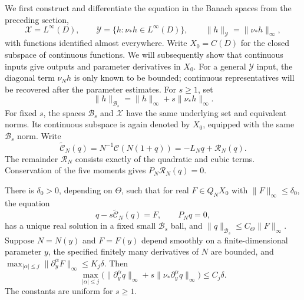 We first construct and differentiate the equation in the Banach spaces
from the preceding section,
\[
 \mathcal X=L^\infty(D),\qquad
 \mathcal Y=\{h:\nu_*h\in L^\infty(D)\},
 \qquad\|h\|_{\mathcal Y}=\|\nu_*h\|_\infty,
\]
with functions identified almost everywhere. Write $X_0=C(D)$ for the
closed subspace of continuous functions. We will subsequently show that
continuous inputs give outputs and parameter derivatives in $X_0$.
For a general $\mathcal Y$ input, the diagonal term $\nu_Nh$ is only
known to be bounded; continuous representatives will be recovered after
the parameter estimates. For $s\ge1$, set
\[
 \|h\|_{\mathcal B_s}=\|h\|_\infty+s\|\nu_*h\|_\infty.
\]
For fixed $s$, the spaces $\mathcal B_s$ and $\mathcal X$ have the same
underlying set and equivalent norms. Its continuous subspace is again
denoted by $X_0$, equipped with the same $\mathcal B_s$ norm. Write
\begin{equation}\label{hyd:remainder}
 \widetilde{\mathcal C}_N(q)=N^{-1}\mathcal C(N(1+q))
             =-L_Nq+\mathcal R_N(q).
\end{equation}
The remainder $\mathcal R_N$ consists exactly of the quadratic and cubic
terms. Conservation of the five moments gives $P_N\mathcal R_N(q)=0$.

\begin{lemma}\label{hyd:cell}
 There is $\delta_0>0$, depending on $\Theta$, such that for real
 $F\in Q_NX_0$ with $\|F\|_\infty\le\delta_0$, the equation
 \begin{equation}\label{hyd:cell-small}
 q-s\widetilde{\mathcal C}_N(q)=F,\qquad P_Nq=0,
 \end{equation}
 has a unique real solution in a fixed small $\mathcal B_s$ ball, and
 $\|q\|_{\mathcal B_s}\le C_\Theta\|F\|_\infty$.
 Suppose $N=N(y)$ and $F=F(y)$ depend smoothly on a finite-dimensional
 parameter $y$, the specified finitely many derivatives of $N$ are
 bounded, and
 $\max_{|\alpha|\le j}\|\partial_y^\alpha F\|_\infty\le K_j\delta$.
 Then
 \begin{equation}\label{hyd:cell-jets}
 \max_{|\alpha|\le j}\bigl(
 \|\partial_y^\alpha q\|_\infty
       +s\|\nu_*\partial_y^\alpha q\|_\infty\bigr)
 \le C_j\delta.
 \end{equation}
 The constants are uniform for $s\ge1$.
\end{lemma}

